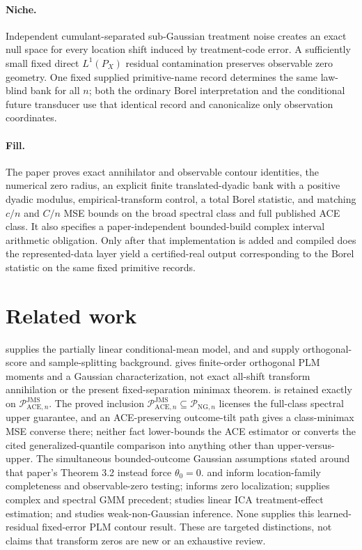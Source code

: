 \documentclass{article}
\begin{document}
\paragraph{Niche.} Independent cumulant-separated sub-Gaussian treatment noise creates an exact null space for every location shift induced by treatment-code error. A sufficiently small fixed direct \(L^1(P_X)\) residual contamination preserves observable zero geometry. One fixed supplied primitive-name record determines the same law-blind bank for all \(n\); both the ordinary Borel interpretation and the conditional future transducer use that identical record and canonicalize only observation coordinates.

\paragraph{Fill.} The paper proves exact annihilator and observable contour identities, the numerical zero radius, an explicit finite translated-dyadic bank with a positive dyadic modulus, empirical-transform control, a total Borel statistic, and matching \(c/n\) and \(C/n\) MSE bounds on the broad spectral class and full published ACE class. It also specifies a paper-independent bounded-build complex interval arithmetic obligation. Only after that implementation is added and compiled does the represented-data layer yield a certified-real output corresponding to the Borel statistic on the same fixed primitive records.

\section{Related work}

\cite{Robinson1988} supplies the partially linear conditional-mean model, and \cite{ChernozhukovEtAl2018DML} and \cite{NeweyRobins2018} supply orthogonal-score and sample-splitting background. \cite{MackeySyrgkanisZadik2018} gives finite-order orthogonal PLM moments and a Gaussian characterization, not exact all-shift transform annihilation or the present fixed-separation minimax theorem. \cite[Theorem 5.4, condition (21), and bound (22)]{JinMackeySyrgkanis2025} is retained exactly on \(\mathcal P_{\mathrm{ACE},n}^{\mathrm{JMS}}\). The proved inclusion \(\mathcal P_{\mathrm{ACE},n}^{\mathrm{JMS}}\subseteq\mathcal P_{\mathrm{NG},n}\) licenses the full-class spectral upper guarantee, and an ACE-preserving outcome-tilt path gives a class-minimax MSE converse there; neither fact lower-bounds the ACE estimator or converts the cited generalized-quantile comparison into anything other than upper-versus-upper. The simultaneous bounded-outcome Gaussian assumptions stated around that paper's Theorem 3.2 instead force \(\theta_0=0\). \cite{Mattner1992} and \cite{HuShiu2022} inform location-family completeness and observable-zero testing; \cite{DinhGhoshTranTran2021} informs zero localization; \cite{ChackoViceira2003} supplies complex and spectral GMM precedent; \cite{ReizingerEtAl2025} studies linear ICA treatment-effect estimation; and \cite{LeeMesters2024} studies weak-non-Gaussian inference. None supplies this learned-residual fixed-error PLM contour result. These are targeted distinctions, not claims that transform zeros are new or an exhaustive review.
\end{document}

